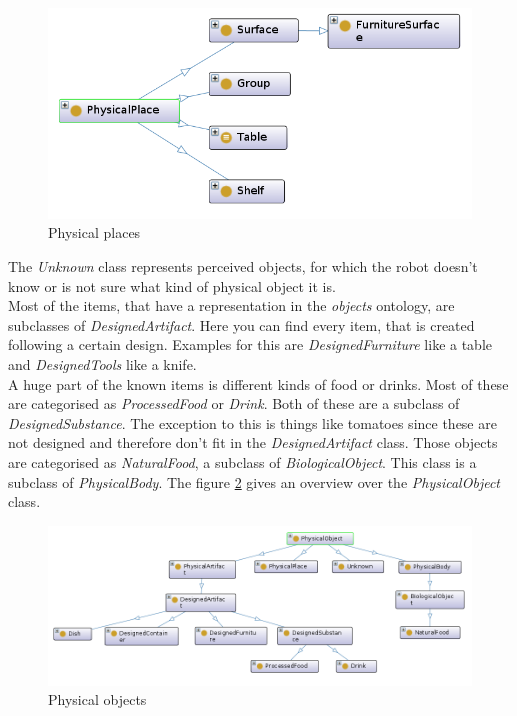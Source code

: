 \documentclass[main.tex]{subfiles}
\begin{document}
\begin{figure}
\centering
\includegraphics[width=1.0\textwidth]{pictures/ontology/Ontologie_place}
\caption{Physical places}
\label{fig:place_ont}
\end{figure}

The \textit{Unknown} class represents perceived objects, for which the robot doesn't know or is not sure what kind of physical object it is.\\
Most of the items, that have a representation in the \textit{objects} ontology, are subclasses of \textit{DesignedArtifact}.
Here you can find every item, that is created following a certain design. 
Examples for this are \textit{DesignedFurniture} like a table and \textit{DesignedTools} like a knife.\\
A huge part of the known items is different kinds of food or drinks. Most of these are categorised as \textit{ProcessedFood} or \textit{Drink}. Both of these are a subclass of \textit{DesignedSubstance}. The exception to this is things like tomatoes since these are not designed and therefore don't fit in the \textit{DesignedArtifact} class. Those objects are categorised as \textit{NaturalFood}, a subclass of \textit{BiologicalObject}. This class is a subclass of \textit{PhysicalBody}. The figure \ref{fig:object_ont} gives an overview over the \textit{PhysicalObject} class.

\begin{rotatepage}
\begin{figure}[H]
\centering
\includegraphics[width=1.5\linewidth, angle=90]{pictures/ontology/Ontologie_objects}
\caption{Physical objects}
\label{fig:object_ont}
\end{figure}
\end{rotatepage}
\end{document}
